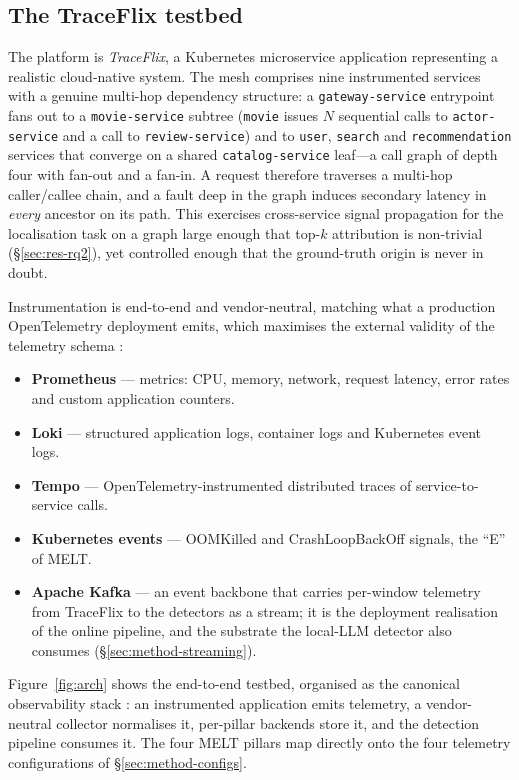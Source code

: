\documentclass[pdflatex,sn-mathphys-num]{sn-jnl}%
\theoremstyle{thmstyleone}%
\theoremstyle{thmstyletwo}%
\theoremstyle{thmstylethree}%
\begin{document}
\subsection{The TraceFlix testbed}\label{sec:method-testbed}

The platform is \emph{TraceFlix}, a Kubernetes microservice application representing a realistic cloud-native system. The mesh comprises nine instrumented services with a genuine multi-hop dependency structure: a \texttt{gateway-service} entrypoint fans out to a \texttt{movie-service} subtree (\texttt{movie} issues $N$ sequential calls to \texttt{actor-service} and a call to \texttt{review-service}) and to \texttt{user}, \texttt{search} and \texttt{recommendation} services that converge on a shared \texttt{catalog-service} leaf---a call graph of depth four with fan-out and a fan-in. A request therefore traverses a multi-hop caller/callee chain, and a fault deep in the graph induces secondary latency in \emph{every} ancestor on its path. This exercises cross-service signal propagation for the localisation task on a graph large enough that top-$k$ attribution is non-trivial (\S\ref{sec:res-rq2}), yet controlled enough that the ground-truth origin is never in doubt.

Instrumentation is end-to-end and vendor-neutral, matching what a production OpenTelemetry deployment emits, which maximises the external validity of the telemetry schema \cite{boten2022,hrusto2026}:
\begin{itemize}
  \item \textbf{Prometheus} --- metrics: CPU, memory, network, request latency, error rates and custom application counters.
  \item \textbf{Loki} --- structured application logs, container logs and Kubernetes event logs.
  \item \textbf{Tempo} --- OpenTelemetry-instrumented distributed traces of service-to-service calls.
  \item \textbf{Kubernetes events} --- OOMKilled and CrashLoopBackOff signals, the ``E'' of MELT.
  \item \textbf{Apache Kafka} \cite{kreps2011kafka} --- an event backbone that carries per-window telemetry from TraceFlix to the detectors as a stream; it is the deployment realisation of the online pipeline, and the substrate the local-LLM detector also consumes (\S\ref{sec:method-streaming}).
\end{itemize}

Figure~\ref{fig:arch} shows the end-to-end testbed, organised as the canonical
observability stack \cite{kosinska2023}: an instrumented application emits
telemetry, a vendor-neutral collector normalises it, per-pillar backends store it,
and the detection pipeline consumes it. The four MELT pillars map directly onto the
four telemetry configurations of \S\ref{sec:method-configs}.
\end{document}
